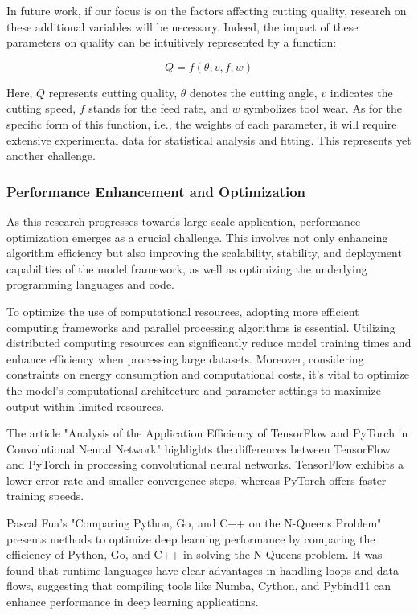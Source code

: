 In future work, if our focus is on the factors affecting cutting quality, research on these additional variables will be necessary. Indeed, the impact of these parameters on quality can be intuitively represented by a function:

\begin{equation}
Q = f(\theta, v, f, w)
\end{equation}

Here, $Q$ represents cutting quality, $\theta$ denotes the cutting angle, $v$ indicates the cutting speed, $f$ stands for the feed rate, and $w$ symbolizes tool wear. As for the specific form of this function, i.e., the weights of each parameter, it will require extensive experimental data for statistical analysis and fitting. This represents yet another challenge.

\subsubsection{Performance Enhancement and Optimization}

As this research progresses towards large-scale application, performance optimization emerges as a crucial challenge. This involves not only enhancing algorithm efficiency but also improving the scalability, stability, and deployment capabilities of the model framework, as well as optimizing the underlying programming languages and code.

To optimize the use of computational resources, adopting more efficient computing frameworks and parallel processing algorithms is essential. Utilizing distributed computing resources can significantly reduce model training times and enhance efficiency when processing large datasets. Moreover, considering constraints on energy consumption and computational costs, it's vital to optimize the model's computational architecture and parameter settings to maximize output within limited resources.

The article "Analysis of the Application Efficiency of TensorFlow and PyTorch in Convolutional Neural Network" highlights the differences between TensorFlow and PyTorch in processing convolutional neural networks\cite{6.2}. TensorFlow exhibits a lower error rate and smaller convergence steps, whereas PyTorch offers faster training speeds.

Pascal Fua's "Comparing Python, Go, and C++ on the N-Queens Problem" presents methods to optimize deep learning performance by comparing the efficiency of Python, Go, and C++ in solving the N-Queens problem\cite{6.3}. It was found that runtime languages have clear advantages in handling loops and data flows, suggesting that compiling tools like Numba, Cython, and Pybind11 can enhance performance in deep learning applications.


